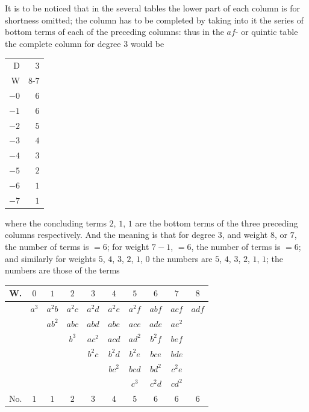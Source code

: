\documentclass[11pt,a4paper]{article}
\begin{document}
It is to be noticed that in the several tables the lower part of each column is for shortness omitted; the column has to be completed by taking into it the series of bottom terms of each of the preceding columns: thus in the $af$- or quintic table the complete column for degree $3$ would be

\begin{center}
\begin{tabular}{r|r}
D & 3 \\
W & $8$-$7$ \\ \hline
$-0$ & $6$ \\
$-1$ & $6$ \\
$-2$ & $5$ \\
$-3$ & $4$ \\
$-4$ & $3$ \\
$-5$ & $2$ \\
$-6$ & $1$ \\
$-7$ & $1$ \\
\end{tabular}
\end{center}

where the concluding terms $2$, $1$, $1$ are the bottom terms of the three preceding columns respectively. And the meaning is that for degree $3$, and weight $8$, or $7$, the number of terms is $=6$; for weight $7-1$, $=6$, the number of terms is $=6$; and similarly for weights $5$, $4$, $3$, $2$, $1$, $0$ the numbers are $5$, $4$, $3$, $2$, $1$, $1$; the numbers are those of the terms

\begin{center}
\begin{tabular}{c|ccccccccc}
W. & $0$ & $1$ & $2$ & $3$ & $4$ & $5$ & $6$ & $7$ & $8$ \\ \hline
& $a^{3}$ & $a^{2}b$ & $a^{2}c$ & $a^{2}d$ & $a^{2}e$ & $a^{2}f$ & $abf$ & $acf$ & $adf$ \\
& & $ab^{2}$ & $abc$ & $abd$ & $abe$ & $ace$ & $ade$ & $ae^{2}$ & \\
& & & $b^{3}$ & $ac^{2}$ & $acd$ & $ad^{2}$ & $b^{2}f$ & $bef$ & \\
& & & & $b^{2}c$ & $b^{2}d$ & $b^{2}e$ & $bce$ & $bde$ & \\
& & & & & $bc^{2}$ & $bcd$ & $bd^{2}$ & $c^{2}e$ & \\
& & & & & & $c^{3}$ & $c^{2}d$ & $cd^{2}$ & \\
\hline
No. & $1$ & $1$ & $2$ & $3$ & $4$ & $5$ & $6$ & $6$ & $6$ \\
\end{tabular}
\end{center}
\end{document}
